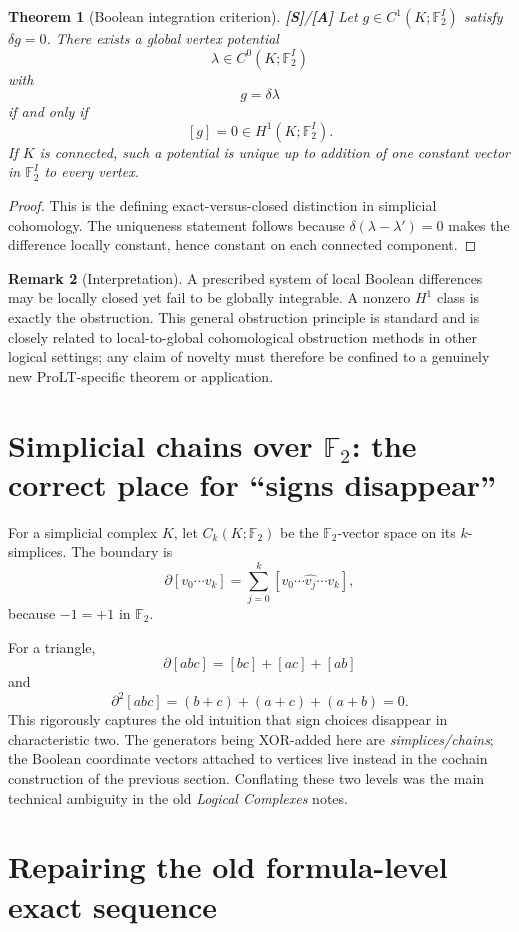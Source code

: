 \documentclass[11pt]{article}
\newtheorem{theorem}{Theorem}[section]
\theoremstyle{definition}
\newtheorem{remark}[theorem]{Remark}
\newcommand{\F}{\mathbb F_2}
\newcommand{\statusS}{\textbf{[S]}}
\newcommand{\statusA}{\textbf{[A]}}
\begin{document}
\begin{theorem}[Boolean integration criterion]\label{thm:integration}
\statusS/\statusA\;
Let $g\in C^1(K;\F^I)$ satisfy $\delta g=0$. There exists a global vertex potential
\[
\lambda\in C^0(K;\F^I)
\]
with
\[
g=\delta\lambda
\]
if and only if
\[
[g]=0\in H^1(K;\F^I).
\]
If $K$ is connected, such a potential is unique up to addition of one constant vector in $\F^I$ to every vertex.
\end{theorem}

\begin{proof}
This is the defining exact-versus-closed distinction in simplicial cohomology. The uniqueness statement follows because $\delta(\lambda-\lambda')=0$ makes the difference locally constant, hence constant on each connected component.
\end{proof}

\begin{remark}[Interpretation]
A prescribed system of local Boolean differences may be locally closed yet fail to be globally integrable. A nonzero $H^1$ class is exactly the obstruction. This general obstruction principle is standard and is closely related to local-to-global cohomological obstruction methods in other logical settings; any claim of novelty must therefore be confined to a genuinely new ProLT-specific theorem or application.
\end{remark}

\section{Simplicial chains over $\F$: the correct place for ``signs disappear''}

For a simplicial complex $K$, let $C_k(K;\F)$ be the $\F$-vector space on its $k$-simplices. The boundary is
\[
\partial[v_0\cdots v_k]
=\sum_{j=0}^k[v_0\cdots\widehat{v_j}\cdots v_k],
\]
because $-1=+1$ in $\F$.

For a triangle,
\[
\partial[abc]=[bc]+[ac]+[ab]
\]
and
\[
\partial^2[abc]
=(b+c)+(a+c)+(a+b)=0.
\]
This rigorously captures the old intuition that sign choices disappear in characteristic two. The generators being XOR-added here are \emph{simplices/chains}; the Boolean coordinate vectors attached to vertices live instead in the cochain construction of the previous section. Conflating these two levels was the main technical ambiguity in the old \emph{Logical Complexes} notes.

\section{Repairing the old formula-level exact sequence}
\end{document}
